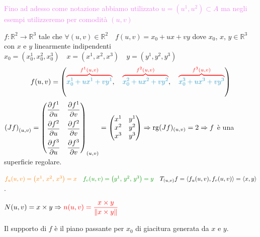         \begin{esempio}
        \textcolor{violet}{Fino ad adesso come notazione abbiamo utilizzato $u=(u^1, u^2) \subset A$ ma negli esempi utilizzeremo
        per comodità $(u, v)$}

        $f \colon \mathbb{R}^2 \to \mathbb{R}^3$ tale che $\forall (u, v) \in \mathbb{R}^2 \quad f(u, v) = x_0 + ux + vy$ dove
        $x_0$, $x$, $y \in \mathbb{R}^3$ con $x$ e $y$ linearmente indipendenti
        $\displaystyle x_0 = (x_0^1, x_0^2, x_0^3) \quad x = (x^1, x^2, x^3) \quad y = (y^1, y^2, y^3)$ 
        \[ f(u,v) = \left(\textcolor{red}{\overbrace{\textcolor{celeste}{x_0^1 + u x^1 + v y^1}}^{f^1(u,v)}} , \quad \textcolor{red}{\overbrace{\textcolor{celeste}{x_0^2 + u x^2 + v y^2}}^{f^2(u,v)}} , \quad \textcolor{red}{\overbrace{\textcolor{celeste}{x_0^3 + u x^3 + v y^3}}^{f^3(u,v)}} \right) \]
        $\displaystyle \left(Jf\right)_{(u,v)} = \begin{pmatrix}
        \dfrac{\partial f^1}{\partial u} & \dfrac{\partial f^1}{\partial v} \\[3mm]
        \dfrac{\partial f^2}{\partial u} & \dfrac{\partial f^2}{\partial v} \\[3mm]
        \dfrac{\partial f^3}{\partial u} & \dfrac{\partial f^3}{\partial v}
        \end{pmatrix}_{(u,v)} = \begin{pmatrix}
        x^1 & y^1 \\
        x^2 & y^2 \\
        x^3 & y^3
        \end{pmatrix} \Rightarrow \operatorname{rg}(Jf)_{(u,v)} = 2 \Rightarrow f$ è una superficie regolare.

        $\textcolor{orange}{f_u(u,v) = \left(x^1, \, x^2, \, x^3\right)=x} \quad \textcolor{verde}{f_v(u,v) = \left(y^1, \, y^2, \, y^3\right)=y} \quad T_{(u,v)}f= \langle f_u(u,v), f_v(u,v) \rangle=\langle x, y \rangle$.

        $N(u,v)= x \times y \Rightarrow \textcolor{red}{n(u,v) = \dfrac{x \times y}{ \lVert x \times y\rVert}}$

        Il supporto di $f$ è il piano passante per $x_0$ di giacitura generata da $x$ e $y$.
        \begin{figure}[H]
        \centering
\end{figure}
\end{esempio}
